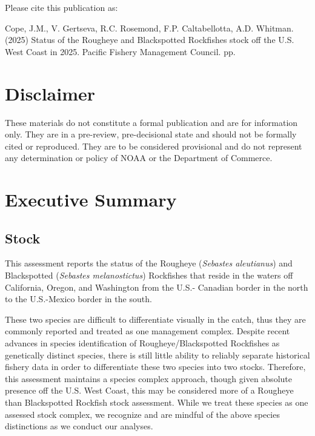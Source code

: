\documentclass[
]{scrartcl}
\renewcommand*\contentsname{Table of contents}
\newcommand\contentsname{Table of contents}
\begin{document}
\renewcommand*\contentsname{Table of contents}
{
\hypersetup{linkcolor=}
\setcounter{tocdepth}{3}
\tableofcontents
}

\newpage{}

Please cite this publication as:

Cope, J.M., V. Gertseva, R.C. Rosemond, F.P. Caltabellotta, A.D.
Whitman. (2025) Status of the Rougheye and Blackspotted Rockfishes stock
off the U.S. West Coast in 2025. Pacific Fishery Management Council.
\pageref*{LastPage}{} pp.

\newpage{}

\section*{Disclaimer}\label{disclaimer}

These materials do not constitute a formal publication and are for
information only. They are in a pre-review, pre-decisional state and
should not be formally cited or reproduced. They are to be considered
provisional and do not represent any determination or policy of NOAA or
the Department of Commerce.

\newpage{}

\setcounter{page}{1}

\renewcommand{\thetable}{\roman{table}}
\renewcommand{\thefigure}{\roman{figure}}

\setlength\parskip{0.5em plus 0.1em minus 0.2em}

\section{Executive Summary}\label{executive-summary}

\subsection{Stock}\label{stock}

This assessment reports the status of the Rougheye (\emph{Sebastes
aleutianus}) and Blackspotted (\emph{Sebastes melanostictus}) Rockfishes
that reside in the waters off California, Oregon, and Washington from
the U.S.- Canadian border in the north to the U.S.-Mexico border in the
south.

These two species are difficult to differentiate visually in the catch,
thus they are commonly reported and treated as one management complex.
Despite recent advances in species identification of
Rougheye/Blackspotted Rockfishes as genetically distinct species, there
is still little ability to reliably separate historical fishery data in
order to differentiate these two species into two stocks. Therefore,
this assessment maintains a species complex approach, though given
absolute presence off the U.S. West Coast, this may be considered more
of a Rougheye than Blackspotted Rockfish stock assessment. While we
treat these species as one assessed stock complex, we recognize and are
mindful of the above species distinctions as we conduct our analyses.
\end{document}

